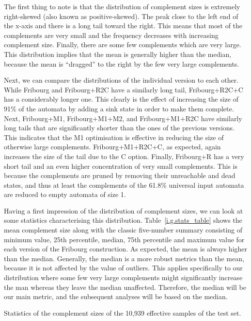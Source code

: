 The first thing to note is that the distribution of complement sizes is extremely right-skewed (also known as positive-skewed). The peak close to the left end of the x-axis and there is a long tail toward the right. This means that most of the complements are very small and the frequency decreases with increasing complement size. Finally, there are some few complements which are very large. This distribution implies that the mean is generally higher than the median, because the mean is ``dragged'' to the right by the few very large complements.

Next, we can compare the distributions of the individual version to each other. While Fribourg and Fribourg+R2C have a similarly long tail, Fribourg+R2C+C has a considerably longer one. This clearly is the effect of increasing the size of 91\% of the automata by adding a sink state in order to make them complete. Next, Fribourg+M1, Fribourg+M1+M2, and Fribourg+M1+R2C have similarly long tails that are significantly shorter than the ones of the previous versions. This indicates that the M1 optimisation is effective in reducing the size of otherwise large complements. Fribourg+M1+R2C+C, as expected, again increases the size of the tail due to the C option. Finally, Fribourg+R has a very short tail and an even higher concentration of very small complements. This is because the complements are pruned by removing their unreachable and dead states, and thus at least the complements of the 61.8\% universal input automata are reduced to empty automata of size 1.

Having a first impression of the distribution of complement sizes, we can look at some statistics characterising this distribution. Table~\ref{i.g.stats_table} shows the mean complement size along with the classic five-number summary consisting of minimum value, 25th percentile, median, 75th percentile and maximum value for each version of the Fribourg construction. As expected, the mean is always higher than the median. Generally, the median is a more robust metrics than the mean, because it is not affected by the value of outliers. This applies specifically to our distribution where some few very large complements might significantly increase the man whereas they leave the median unaffected. Therefore, the median will be our main metric, and the subsequent analyses will be based on the median.

\begin{table}[ht]
\centering

\caption{Statistics of the complement sizes of the 10,939 effective samples of the \goal{} test set.}
\label{i.g.stats_table}
\end{table}


